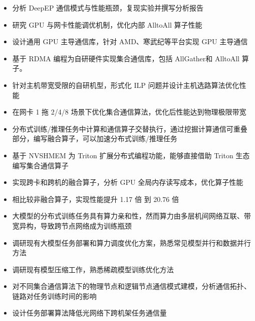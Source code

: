 \documentclass{resume}
\begin{document}
\begin{itemize}[parsep=0.5ex]
  \item 分析 DeepEP 通信模式与性能瓶颈，复现实验并撰写分析报告
  \item 研究 GPU 与网卡性能调优机制，优化内部 AlltoAll 算子性能
  \item 设计通用 GPU 主导通信库，针对 AMD、寒武纪等平台实现 GPU 主导通信
\end{itemize}

\begin{itemize}[parsep=0.5ex]
  \item 基于 RDMA 编程为自研硬件实现集合通信库，包括 AllGather和 AlltoAll 算子。
  \item 针对主机带宽受限的自研机型，形式化 ILP 问题并设计主机选路算法优化性能
  \item 在网卡 1 拖 2/4/8 场景下优化集合通信算法，优化后性能达到物理极限带宽
\end{itemize}

\begin{itemize}[parsep=0.5ex]
  \item 分布式训练/推理任务中计算和通信算子交替执行，通过挖掘计算通信可重叠部分，编写融合算子，可以加速分布式训练/推理任务
  \item 基于 NVSHMEM 为 Triton 扩展分布式编程功能，能够直接借助 Triton 生态编写集合通信算子
  \item 实现跨卡和跨机的融合算子，分析 GPU 全局内存读写成本，优化算子性能
  \item 相比较非融合算子，实现性能提升 1.17 倍 到 20.76 倍
\end{itemize}

\begin{itemize}[parsep=0.5ex]
  \item 大模型的分布式训练任务具有算力亲和性，然而算力由多层机间网络互联、带宽异构，导致跨节点网络成为训练瓶颈
  \item 调研现有大模型任务部署和算力调度优化方案，熟悉常见模型并行和数据并行方法
  \item 调研现有模型压缩工作，熟悉稀疏模型训练优化方法
  \item 对不同集合通信算法下的物理节点和逻辑节点通信模式建模，分析通信拓扑、链路对任务训练时间的影响
  \item 设计任务部署算法降低光网络下跨机架任务通信量
\end{itemize}
\end{document}
